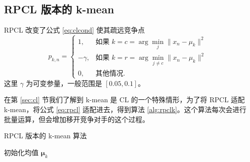         \subsection{RPCL 版本的 k-mean} 

        RPCL 改变了公式 \eqref{eq:clcond} 使其疏远竞争点
        \begin{equation}
            p_{k,n}=\begin{cases}
                1, & \text{如果 }k=c=\arg\min_j\|x_n-\mu_k\|^2\\
                -\gamma, & \text{如果 }k=r=\arg\min_{j\neq c}\|x_n-\mu_k\|^2\\
                0, & \text{其他情况}.
            \end{cases}\label{eq:rpcl}
        \end{equation}
        这里 $\gamma$ 为可变参量，一般范围是 $[0.05,0.1]$。

        在第 \ref{sec:cl} 节我们了解到 k-mean 是 CL 的一个特殊情形，为了将 RPCL 适配 k-mean，将公式 \eqref{eq:rpcl} 适配进去，得到算法 \ref{alg:rpclk}。这个算法每次会进行批量运算，但会增加移开竞争对手的这个过程。

        \begin{algorithm}
            \caption{RPCL 版本的 k-mean 算法}\label{alg:rpclk}
            \BlankLine
            初始化均值 $\bm{\mu}_k$\;
            \Return{$\bm{\mu}$}\;
        \end{algorithm}

